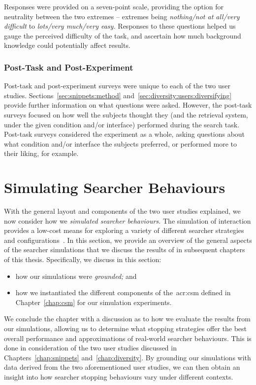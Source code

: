 Responses were provided on a seven-point scale, providing the option for neutrality between the two extremes -- extremes being \emph{nothing/not at all/very difficult} to \emph{lots/very much/very easy.} Responses to these questions helped us gauge the perceived difficulty of the task, and ascertain how much background knowledge could potentially affect results.

\subsubsection{Post-Task and Post-Experiment}
Post-task and post-experiment surveys were unique to each of the two user studies. Sections~\ref{sec:snippets:method} and~\ref{sec:diversity:users:diversifying} provide further information on what questions were asked. However, the post-task surveys focused on how well the subjects thought they (and the retrieval system, under the given condition and/or interface) performed during the search task. Post-task surveys considered the experiment as a whole, asking questions about what condition and/or interface the subjects preferred, or performed more to their liking, for example.

\section{Simulating Searcher Behaviours}\label{sec:method:simulation}
With the general layout and components of the two user studies explained, we now consider how we \emph{simulated searcher behaviours.} The simulation of interaction provides a low-cost means for exploring a variety of different searcher strategies and configurations~\citep{azzopardi2010workshop}. In this section, we provide an overview of the general aspects of the  searcher simulations that we discuss the results of in subsequent chapters of this thesis. Specifically, we discuss in this section:

\begin{itemize}
    \item{how our simulations were \emph{grounded;} and}
    \item{how we instantiated the different components of the~\gls{acr:csm} defined in Chapter~\ref{chap:csm} for our simulation experiments.}
\end{itemize}

We conclude the chapter with a discussion as to how we evaluate the results from our simulations, allowing us to determine what stopping strategies offer the best overall performance and approximations of real-world searcher behaviours. This is done in consideration of the two user studies discussed in Chapters~\ref{chap:snippets} and~\ref{chap:diversity}. By grounding our simulations with data derived from the two aforementioned user studies, we can then obtain an insight into how searcher stopping behaviours vary under different contexts.


